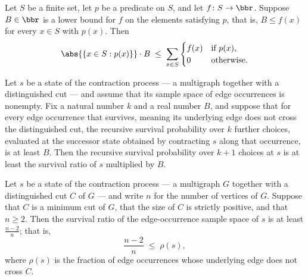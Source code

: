 \begin{lemma}
\label{KargerTrace.card_mul_le_sum_ite_of_lower_bound}
\leanok
{}
Let $S$ be a finite set, let $p$ be a predicate on $S$, and let $f\colon S \to \bbr$.
Suppose $B \in \bbr$ is a lower bound for $f$ on the elements satisfying $p$, that is,
$B \le f(x)$ for every $x \in S$ with $p(x)$. Then
\[
\abs{\{x \in S : p(x)\}} \cdot B \;\le\; \sum_{x \in S} \begin{cases} f(x) & \text{if }
p(x),\\ 0 & \text{otherwise.}\end{cases}
\]
\end{lemma}

\begin{lemma}
\label{KargerTrace.survivalEventProb_step_lower_bound}
\leanok
{}
Let $s$ be a state of the contraction process — a multigraph together with a
distinguished cut — and assume that its sample space of edge occurrences is nonempty.
Fix a natural number $k$ and a real number $B$, and suppose that for every edge
occurrence that survives, meaning its underlying edge does not cross the distinguished
cut, the recursive survival probability over $k$ further choices, evaluated at the
successor state obtained by contracting $s$ along that occurrence, is at least $B$. Then
the recursive survival probability over $k+1$ choices at $s$ is at least the survival
ratio of $s$ multiplied by $B$.
\end{lemma}

\begin{lemma}
\label{KargerTrace.edgeChoiceSurvivalRatio_ge_factor}
\leanok
{}
Let $s$ be a state of the contraction process — a multigraph $G$ together with a
distinguished cut $C$ of $G$ — and write $n$ for the number of vertices of $G$. Suppose
that $C$ is a minimum cut of $G$, that the size of $C$ is strictly positive, and that $n
\ge 2$. Then the survival ratio of the edge-occurrence sample space of $s$ is at least
$\tfrac{n-2}{n}$; that is,
\[
  \frac{n-2}{n} \;\le\; \rho(s),
\]
where $\rho(s)$ is the fraction of edge occurrences whose underlying edge does not cross
$C$.
\end{lemma}

